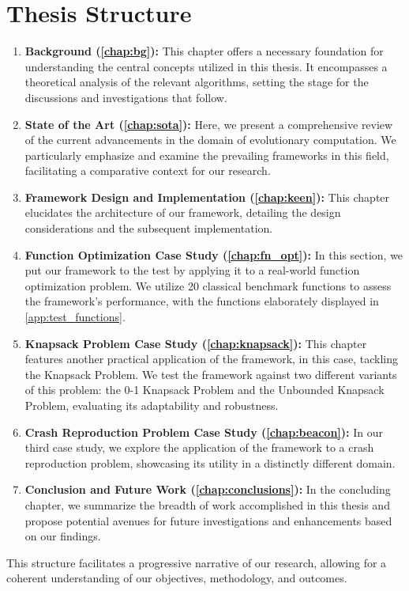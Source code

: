 \section{Thesis Structure}
\label{sec:structure}

  \begin{enumerate}
    \item \textbf{Background (\vref{chap:bg}):} This chapter offers a necessary 
      foundation for understanding the central concepts utilized in this thesis.
      It encompasses a theoretical analysis of the relevant algorithms, setting 
      the stage for the discussions and investigations that follow.
    \item \textbf{State of the Art (\vref{chap:sota}):} Here, we present a 
      comprehensive review of the current advancements in the domain of 
      evolutionary computation.
      We particularly emphasize and examine the prevailing frameworks in this 
      field, facilitating a comparative context for our research.
    \item \textbf{Framework Design and Implementation (\vref{chap:keen}):} This 
      chapter elucidates the architecture of our framework, detailing the
      design considerations and the subsequent implementation.
    \item \textbf{Function Optimization Case Study (\vref{chap:fn_opt}):} In 
      this section, we put our framework to the test by applying it to a 
      real-world function optimization problem.
      We utilize 20 classical benchmark functions to assess the framework's 
      performance, with the functions elaborately displayed in 
      \vref{app:test_functions}.
    \item \textbf{Knapsack Problem Case Study 
      (\vref{chap:knapsack}):} This chapter features another 
      practical application of the framework, in this case, tackling the 
      Knapsack Problem.
      We test the framework against two different variants of this problem: the 
      0-1 Knapsack Problem and the Unbounded Knapsack Problem, evaluating its 
      adaptability and robustness.
    \item \textbf{Crash Reproduction Problem Case Study (\vref{chap:beacon}):} 
      In our third case study, we explore the application of the framework to a 
      crash reproduction problem, showcasing its utility in a distinctly 
      different domain.
    \item \textbf{Conclusion and Future Work (\vref{chap:conclusions}):} In the 
      concluding chapter, we summarize the breadth of work accomplished in this 
      thesis and propose potential avenues for future investigations and 
      enhancements based on our findings.
  \end{enumerate}

  This structure facilitates a progressive narrative of our research, allowing 
  for a coherent understanding of our objectives, methodology, and outcomes.
